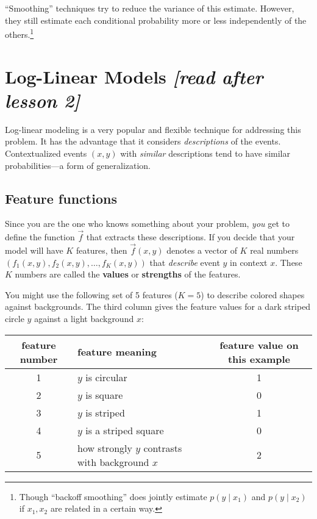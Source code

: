 \documentclass[11pt]{article}
\newcommand{\ph}{\hat{p}}
\begin{document}
\noindent
``Smoothing'' techniques try to reduce the variance of this estimate.
However, they still estimate each conditional probability more or less
independently of the others.\footnote{Though ``backoff smoothing'' does jointly
  estimate $p(y \mid x_1)$ and $p(y \mid x_2)$ if $x_1, x_2$ are
  related in a certain way.}

\section{Log-Linear Models {\em [read after lesson 2]}}

Log-linear modeling is a very popular and flexible technique for
addressing this problem.  It has the advantage that it considers {\em
  descriptions} of the events.  Contextualized events $(x,y)$ with
{\em similar} descriptions tend to have similar probabilities---a form
of generalization.

\subsection{Feature functions}\label{sec:featfuncs}

Since you are the one who knows something about your problem, {\em
  you} get to define the function $\vec{f}$ that extracts these
descriptions.  If you decide that your model will have $K$ features,
then $\vec{f}(x,y)$ denotes a vector of $K$ real numbers $(f_1(x,y),
f_2(x,y), \ldots, f_K(x,y))$ that {\em describe} event $y$ in context
$x$.  These $K$ numbers are called the {\bf values} or {\bf strengths}
of the features.

\medskip

You might use the following set of 5 features ($K=5$) to describe
colored shapes against backgrounds.  The third column gives the
feature values for a dark striped circle $y$ against a light
background $x$:

\smallskip\noindent
\begin{tabular}{|c|l|c|} \hline
feature number & feature meaning   & feature value on this example \\ \hline
1              & $y$ is circular   &    1 \\
2              & $y$ is square     &    0 \\
3              & $y$ is striped    &    1 \\
4              & $y$ is a striped square & 0 \\
5              & how strongly $y$ contrasts with background $x$ & 2 \\ \hline
\end{tabular}
\smallskip
\end{document}
